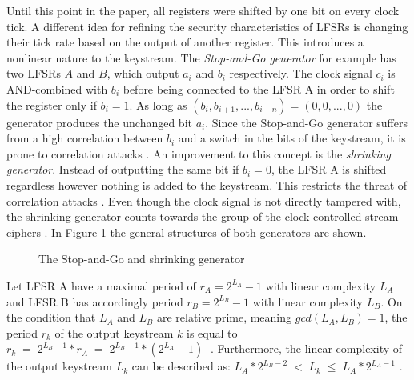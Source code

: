 Until this point in the paper, all registers were shifted by one bit on every clock tick. A different idea for refining the security characteristics of LFSRs is changing their tick rate based on the output of another register. This introduces a nonlinear nature to the keystream. The \emph{Stop-and-Go generator} for example has two LFSRs $A$ and $B$, which output $a_i$ and $b_i$ respectively. The clock signal $c_i$ is AND-combined with $b_i$ before being connected to the LFSR A in order to shift the register only if $b_i=1$. As long as $(b_i, b_{i+1}, ..., b_{i+n}) = (0,0,...,0)$ the generator produces the unchanged bit $a_i$. \cite[pp. 89-90]{Beth.1985b} Since the Stop-and-Go generator suffers from a high correlation between $b_i$ and a switch in the bits of the keystream, it is prone to correlation attacks \cite[p. 156]{Klein.2013}. An improvement to this concept is the \emph{shrinking generator}. Instead of outputting the same bit if $b_i=0$, the LFSR A is shifted regardless however nothing is added to the keystream. This restricts the threat of correlation attacks \cite[p. 159]{Klein.2013}. Even though the clock signal is not directly tampered with, the shrinking generator counts towards the group of the clock-controlled stream ciphers \cite[p. 23]{Robshaw.1995}. In Figure \ref{fig:clocked-generators} the general structures of both generators are shown.

\begin{figure}[htpb]
	\vspace{0.5cm}
	\centering
	\small
	
	\caption{The Stop-and-Go \cite[pp. 89-90]{Beth.1985b} and shrinking generator \cite[p. 159]{Klein.2013}}
	\label{fig:clocked-generators}
	\vspace{0.3cm}
\end{figure}

Let LFSR A have a maximal period of $r_A=2^{L_A}-1$ with linear complexity $L_A$ and LFSR B has accordingly period $r_B=2^{L_B}-1$ with linear complexity $L_B$. On the condition that $L_A$ and $L_B$ are relative prime, meaning $gcd(L_A, L_B)=1$, the period $r_k$ of the output keystream $k$ is equal to $r_k\;=\;2^{L_B-1}*r_A\;=\;2^{L_B-1}*(2^{L_A}-1)\;$ \cite[p. 25]{coppersmith1993shrinking}\cite[p. 159]{Klein.2013}. Furthermore, the linear complexity of the output keystream $L_k$ can be described as: \space $L_A*2^{L_B-2} \;<\; L_k \;\leq\; L_A*2^{L_A-1}$ \cite[p. 25]{coppersmith1993shrinking}. \\

